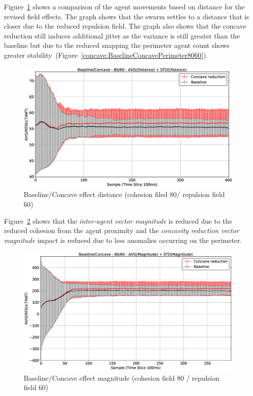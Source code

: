 Figure~\ref{concave:BaselineConcaveEffectDist8060} shows a comparison of the agent movements based on distance for the revised field effects. The graph shows that the swarm settles to a distance that is closer due to the reduced repulsion field. The graph also shows that the concave reduction still induces additional jitter as the variance is still greater than the baseline but due to the reduced snapping the perimeter agent count shows greater stability~(Figure~\ref{concave:BaselineConcavePerimeter8060}). 
\begin{figure}[H]
\begin{center}
\includegraphics[width=14cm]{CHAPTER-7/figures/BaselineConcaveEffectDist8060}
\end{center}
\caption{Baseline/Concave effect distance (cohesion filed 80/ repulsion field 60)\label{concave:BaselineConcaveEffectDist8060}}
\end{figure}

Figure~\ref{concave:BaselineConcaveEffectMag8060} shows that the \textit{inter-agent vector magnitude} is reduced due to the reduced cohesion from the agent proximity and the \textit{concavity reduction vector magnitude} impact is reduced due to less anomalies occurring on the perimeter.
\begin{figure}[H]
\begin{center}
\includegraphics[width=14cm]{CHAPTER-7/figures/BaselineConcaveEffectMag8060}
\end{center}
\caption{Baseline/Concave effect magnitude (cohesion field 80 / repulsion field 60)\label{concave:BaselineConcaveEffectMag8060}}
\end{figure}

